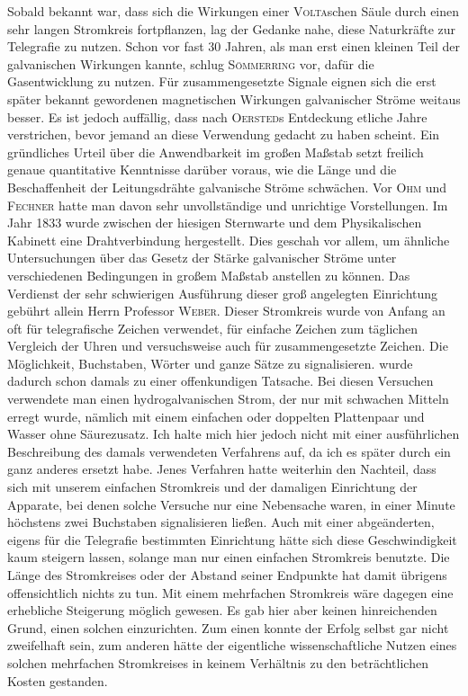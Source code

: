 Sobald bekannt war, dass sich die Wirkungen einer \textsc{Volta}schen Säule durch einen sehr langen Stromkreis fortpflanzen, lag der Gedanke nahe, diese Naturkräfte zur Telegrafie zu nutzen. Schon vor fast 30 Jahren, als man erst einen kleinen Teil der galvanischen Wirkungen kannte, schlug \textsc{Sömmerring} vor, dafür die Gasentwicklung zu nutzen. Für zusammengesetzte Signale eignen sich die erst später bekannt gewordenen magnetischen Wirkungen galvanischer Ströme weitaus besser. Es ist jedoch auffällig, dass nach \textsc{Oersted}s Entdeckung etliche Jahre verstrichen, bevor jemand an diese Verwendung gedacht zu haben scheint. Ein gründliches Urteil über die Anwendbarkeit im großen Maßstab setzt freilich genaue quantitative Kenntnisse darüber voraus, wie die Länge und die Beschaffenheit der Leitungsdrähte galvanische Ströme schwächen. Vor \textsc{Ohm} und \textsc{Fechner} hatte man davon sehr unvollständige und unrichtige Vorstellungen. Im Jahr 1833 wurde zwischen der hiesigen Sternwarte und dem Physikalischen Kabinett eine Drahtverbindung hergestellt. Dies geschah vor allem, um ähnliche Untersuchungen über das Gesetz der Stärke galvanischer Ströme unter verschiedenen Bedingungen in großem Maßstab anstellen zu können. Das Verdienst der sehr schwierigen Ausführung dieser groß angelegten Einrichtung gebührt allein Herrn Professor \textsc{Weber}. Dieser Stromkreis wurde von Anfang an oft für telegrafische Zeichen verwendet, für einfache Zeichen zum täglichen Vergleich der Uhren und versuchsweise auch für zusammengesetzte Zeichen. Die Möglichkeit, Buchstaben, Wörter und ganze Sätze zu signalisieren. wurde dadurch schon damals zu einer offenkundigen Tatsache. Bei diesen Versuchen verwendete man einen hydrogalvanischen Strom, der nur mit schwachen Mitteln erregt wurde, nämlich mit einem einfachen oder doppelten Plattenpaar und Wasser ohne Säurezusatz. Ich halte mich hier jedoch nicht mit einer ausführlichen Beschreibung des damals verwendeten Verfahrens auf, da ich es später durch ein ganz anderes ersetzt habe. Jenes Verfahren hatte weiterhin den Nachteil, dass sich mit unserem einfachen Stromkreis und der damaligen Einrichtung der Apparate, bei denen solche Versuche nur eine Nebensache waren, in einer Minute höchstens zwei Buchstaben signalisieren ließen. Auch mit einer abgeänderten, eigens für die Telegrafie bestimmten Einrichtung hätte sich diese Geschwindigkeit kaum steigern lassen, solange man nur einen einfachen Stromkreis benutzte. Die Länge des Stromkreises oder der Abstand seiner Endpunkte hat damit übrigens offensichtlich nichts zu tun. Mit einem mehrfachen Stromkreis wäre dagegen eine erhebliche Steigerung möglich gewesen. Es gab hier aber keinen hinreichenden Grund, einen solchen einzurichten. Zum einen konnte der Erfolg selbst gar nicht zweifelhaft sein, zum anderen hätte der eigentliche wissenschaftliche Nutzen eines solchen mehrfachen Stromkreises in keinem Verhältnis zu den beträchtlichen Kosten gestanden.

